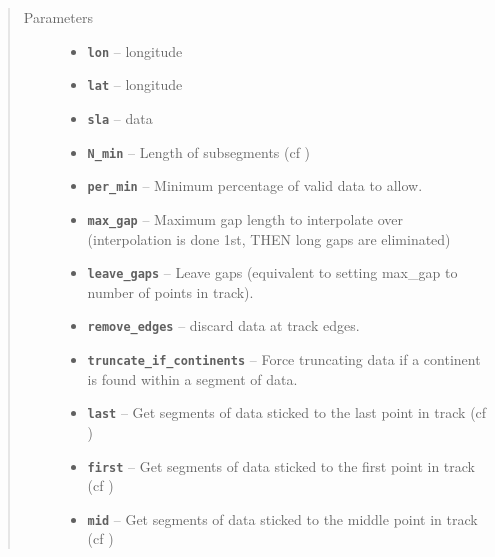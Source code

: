 \documentclass[letterpaper,10pt,english]{sphinxmanual}
\begin{document}
\begin{fulllineitems}
\begin{description}
\begin{itemize}
\begin{description}
\end{description}

\end{itemize}

\end{description}
\begin{quote}\begin{description}
\item[{Parameters}] \leavevmode\begin{itemize}
\item {} 
\textbf{\texttt{lon}} -- longitude

\item {} 
\textbf{\texttt{lat}} -- longitude

\item {} 
\textbf{\texttt{sla}} -- data

\item {} 
\textbf{\texttt{N\_min}} -- Length of subsegments (cf )

\item {} 
\textbf{\texttt{per\_min}} -- Minimum percentage of valid data to allow.

\item {} 
\textbf{\texttt{max\_gap}} -- Maximum gap length to interpolate over (interpolation is done 1st, THEN long gaps are eliminated)

\item {} 
\textbf{\texttt{leave\_gaps}} -- Leave gaps (equivalent to setting max\_gap to number of points in track).

\item {} 
\textbf{\texttt{remove\_edges}} -- discard data at track edges.

\item {} 
\textbf{\texttt{truncate\_if\_continents}} -- Force truncating data if a continent is found within a segment of data.

\item {} 
\textbf{\texttt{last}} -- Get segments of data sticked to the last point in track (cf )

\item {} 
\textbf{\texttt{first}} -- Get segments of data sticked to the first point in track (cf )

\item {} 
\textbf{\texttt{mid}} -- Get segments of data sticked to the middle point in track (cf )

\end{itemize}

\end{description}\end{quote}

\end{fulllineitems}
\end{document}
